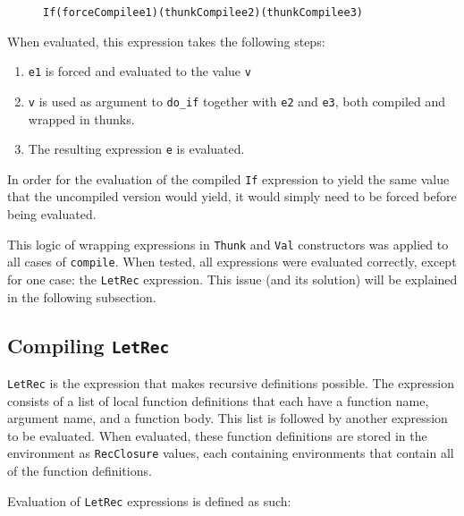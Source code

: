 \begin{figure}[H]
\begin{alltt}
  If (forceCompile e1) (thunkCompile e2) (thunkCompile e3)
\end{alltt}
\end{figure}

\noindent When evaluated, this expression takes the following steps:

\begin{enumerate}
\item \texttt{e1} is forced and evaluated to the value \texttt{v}
\item \texttt{v} is used as argument to \texttt{do\_if} together with \texttt{e2} and \texttt{e3}, both compiled and wrapped in thunks.
\item The resulting expression \texttt{e} is evaluated.
\end{enumerate}

\noindent In order for the evaluation of the compiled \texttt{If} expression to
yield the same value that the uncompiled version would yield, it would simply
need to be forced before being evaluated.

This logic of wrapping expressions in \texttt{Thunk} and \texttt{Val}
constructors was applied to all cases of \texttt{compile}. When tested, all
expressions were evaluated correctly, except for one case: the \texttt{LetRec}
expression. This issue (and its solution) will be explained in the following
subsection.

\subsection{Compiling \texttt{LetRec}}
\texttt{LetRec} is the expression that makes recursive definitions possible.
The expression consists of a list of local function definitions that each have a
function name, argument name, and a function body. This list is followed by
another expression to be evaluated. When evaluated, these function definitions
are stored in the environment as \texttt{RecClosure} values, each containing
environments that contain all of the function definitions.

Evaluation of \texttt{LetRec} expressions is defined as such:

